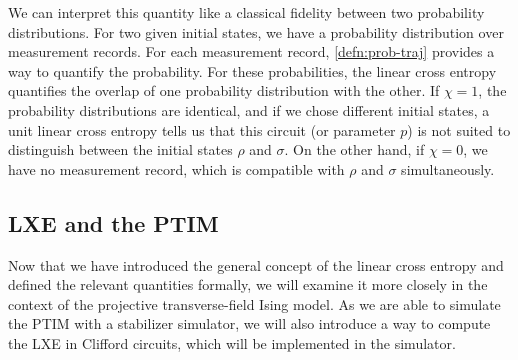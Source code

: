 We can interpret this quantity like a classical fidelity between two
probability distributions. For two given initial states, we have a probability
distribution over measurement records. For each measurement record,
\cref{defn:prob-traj} provides a way to quantify the probability. For these
probabilities, the linear cross entropy quantifies the overlap of one
probability distribution with the other. If $\chi = 1$, the probability
distributions are identical, and if we chose different initial states, a unit
linear cross entropy tells us that this circuit (or parameter $p$) is not
suited to distinguish between the initial states $\rho$ and $\sigma$. On the
other hand, if $\chi=0$, we have no measurement record, which is compatible
with $\rho$ and $\sigma$ simultaneously.

\subsection{LXE and the PTIM}\label{sec:lxe-for-ptim}
Now that we have introduced the general concept of the linear cross entropy and
defined the relevant quantities formally, we will examine it more closely in
the context of the projective transverse-field Ising model. As we are able to
simulate the PTIM with a stabilizer simulator, we will also introduce a way to
compute the LXE in Clifford circuits, which will be implemented in the
simulator.

